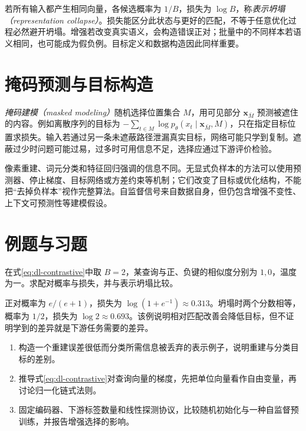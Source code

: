 若所有输入都产生相同向量，各候选概率为 $1/B$，损失为 $\log B$，称\emph{表示坍塌（representation collapse）}。损失能区分此状态与更好的匹配，不等于任意优化过程必然避开坍塌。增强若改变真实语义，会构造错误正对；批量中的不同样本若语义相同，也可能成为假负例。目标定义和数据构造因此同样重要。

\section{掩码预测与目标构造}
\emph{掩码建模（masked modeling）}随机选择位置集合 $M$，用可见部分 $\mathbf x_{\bar M}$ 预测被遮住的内容。例如离散序列的目标为 $-\sum_{t\in M}\log p_\theta(x_t\mid\mathbf x_{\bar M},M)$，只在指定目标位置求损失。输入若通过另一条未遮蔽路径泄漏真实目标，网络可能只学到复制。遮蔽过少时问题可能过易，过多时可用信息不足，选择应通过下游评价检验。

像素重建、词元分类和特征回归强调的信息不同。无显式负样本的方法可以使用预测器、停止梯度、目标网络或方差约束等机制；它们改变了目标或优化结构，不能把“去掉负样本”视作完整算法。自监督信号来自数据自身，但仍包含增强不变性、上下文可预测性等建模假设。

\section{例题与习题}
\begin{example}[温度化匹配]
在式\eqref{eq:dl-contrastive}中取 $B=2$，某查询与正、负键的相似度分别为 $1,0$，温度为一。求配对概率与损失，并与表示坍塌比较。
\end{example}
\begin{solve}
正对概率为 $e/(e+1)$，损失为 $\log(1+e^{-1})\approx0.313$。坍塌时两个分数相等，概率为 $1/2$，损失为 $\log2\approx0.693$。该例说明相对匹配改善会降低目标，但不证明学到的差异就是下游任务需要的差异。
\end{solve}
\begin{enumerate}
\item 构造一个重建误差很低而分类所需信息被丢弃的表示例子，说明重建与分类目标的差别。
\item 推导式\eqref{eq:dl-contrastive}对查询向量的梯度，先把单位向量看作自由变量，再讨论归一化链式法则。
\item 固定编码器、下游标签数量和线性探测协议，比较随机初始化与一种自监督预训练，并报告增强选择的影响。
\end{enumerate}


